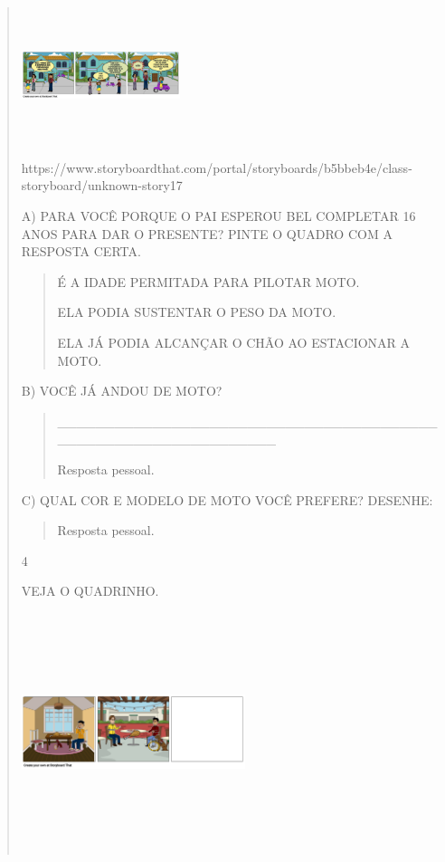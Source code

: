 \begin{verse}
{{{\includegraphics[width=1.82014in,height=1.55486in]{media/image130.png}

https://www.storyboardthat.com/portal/storyboards/b5bbeb4e/class-storyboard/unknown-story17

A) PARA VOCÊ PORQUE O PAI ESPEROU BEL COMPLETAR 16 ANOS PARA DAR O
PRESENTE? PINTE O QUADRO COM A RESPOSTA CERTA.

\begin{quote}
É A IDADE PERMITADA PARA PILOTAR MOTO.

ELA PODIA SUSTENTAR O PESO DA MOTO.

ELA JÁ PODIA ALCANÇAR O CHÃO AO ESTACIONAR A MOTO.
\end{quote}

B) VOCÊ JÁ ANDOU DE MOTO?

\begin{quote}
\_\_\_\_\_\_\_\_\_\_\_\_\_\_\_\_\_\_\_\_\_\_\_\_\_\_\_\_\_\_\_\_\_\_\_\_\_\_\_\_\_\_\_\_\_\_\_\_\_\_\_\_\_\_\_\_\_\_\_\_\_\_\_

Resposta pessoal.
\end{quote}

C) QUAL COR E MODELO DE MOTO VOCÊ PREFERE? DESENHE:

\begin{quote}
Resposta pessoal.
\end{quote}

\num{4}

VEJA O QUADRINHO.

\includegraphics[width=2.57222in,height=2.73403in]{media/image131.png}

}}}
\end{verse}

